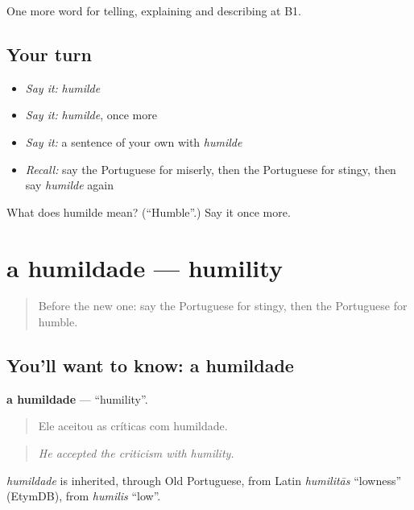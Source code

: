 \begin{grammarlens}[title={What you've built}]
One more word for telling, explaining and describing at B1.
\end{grammarlens}

\subsection*{Your turn}
\begin{itemize}
\raggedright
  \item \emph{Say it:} \emph{humilde}
  \item \emph{Say it:} \emph{humilde}, once more
  \item \emph{Say it:} a sentence of your own with \emph{humilde}
  \item \emph{Recall:} say the Portuguese for miserly, then the Portuguese for stingy, then say \emph{humilde} again
\end{itemize}

\begin{tcolorbox}[breakable,colback=teal!4,colframe=teal!35!black,title={Before you move on}]
What does humilde mean? (\textquotedblleft{}Humble\textquotedblright{}.) Say it once more.
\end{tcolorbox}
\section[a humildade]{a humildade — humility}

\label{lesson:PT-C470-humildade}



\begin{quote}
Before the new one: say the Portuguese for stingy, then the Portuguese for humble.
\end{quote}

\subsection*{You'll want to know: a humildade}
\textbf{a humildade} — \textquotedblleft{}humility\textquotedblright{}.

\begin{quote}
Ele aceitou as críticas com humildade.
\end{quote}

\begin{quote}
\emph{He accepted the criticism with humility.}
\end{quote}

\begin{cousinweb}
\emph{humildade} is inherited, through Old Portuguese, from Latin \emph{humilitās} \textquotedblleft{}lowness\textquotedblright{} (EtymDB), from \emph{humilis} \textquotedblleft{}low\textquotedblright{}.
\end{cousinweb}

